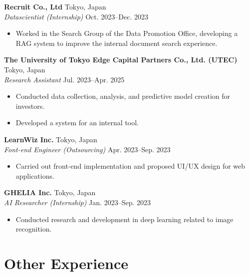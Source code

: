 \documentclass{article}
\begin{document}
\textbf{Recruit Co., Ltd}
\hspace{\fill}Tokyo, Japan\\
\textit{Datascientist (Internship)}
\hspace{\fill}Oct. 2023--Dec. 2023
\begin{itemize}[parsep=0pt, after=\vspace{5pt}]
  \item Worked in the Search Group of the Data Promotion Office, developing a RAG system to improve the internal document search experience.
\end{itemize}

\textbf{The University of Tokyo Edge Capital Partners Co., Ltd. (UTEC)}
\hspace{\fill}Tokyo, Japan\\
\textit{Research Assistant}
\hspace{\fill}Jul. 2023--Apr. 2025
\begin{itemize}[parsep=0pt, after=\vspace{5pt}]
  \item Conducted data collection, analysis, and predictive model creation for investors.
  \item Developed a system for an internal tool.
\end{itemize}

\textbf{LearnWiz Inc.}
\hspace{\fill}Tokyo, Japan\\
\textit{Font-end Engineer (Outsourcing)}
\hspace{\fill}Apr. 2023--Sep. 2023
\begin{itemize}[parsep=0pt, after=\vspace{5pt}]
  \item Carried out front-end implementation and proposed UI/UX design for web applications.
\end{itemize}

\textbf{GHELIA Inc.}
\hspace{\fill}Tokyo, Japan\\
\textit{AI Researcher (Internship)}
\hspace{\fill}Jan. 2023--Sep. 2023
\begin{itemize}[parsep=0pt, after=\vspace{5pt}]
  \item Conducted research and development in deep learning related to image recognition.
\end{itemize}


\section{Other Experience}
\end{document}
